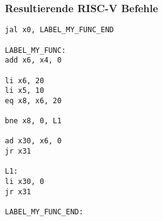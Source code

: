 \subsubsection{Resultierende RISC-V Befehle}

\begin{lstlisting}
jal x0, LABEL_MY_FUNC_END

LABEL_MY_FUNC:
add x6, x4, 0

li x6, 20
li x5, 10
eq x8, x6, 20

bne x8, 0, L1

ad x30, x6, 0
jr x31

L1:
li x30, 0
jr x31

LABEL_MY_FUNC_END:
\end{lstlisting}
